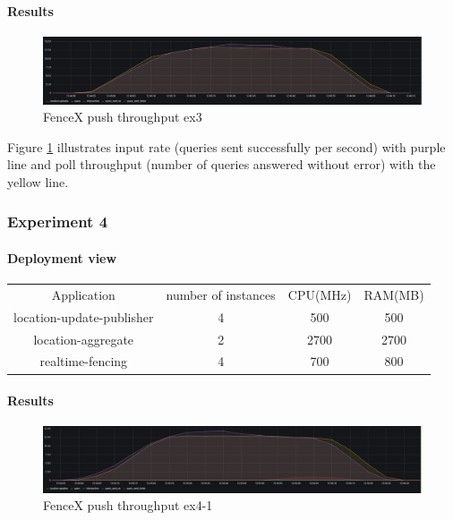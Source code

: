 \documentclass[a4]{report}
\begin{document}
    \paragraph{Results}
    \begin{figure}[ht]
        \caption{FenceX push throughput ex3}
        \label{fig:ex3}
        \includegraphics[scale=0.4]{images/evaluation/ex3-benchmarking(16,9).png}
    \end{figure}

    Figure \ref{fig:ex3} illustrates input rate (queries sent successfully per second) with purple line and poll
    throughput (number of queries answered without error) with the yellow line.

    \subsubsection{Experiment 4}

    \paragraph{Deployment view}
    \begin{center}
        \begin{tabular}{ c c c c }
            Application               & number of instances & CPU(MHz) & RAM(MB) \\
            location-update-publisher & 4                   & 500      & 500     \\
            location-aggregate        & 2                   & 2700     & 2700    \\
            realtime-fencing          & 4                   & 700      & 800     \\
        \end{tabular}
    \end{center}

    \paragraph{Results}
    \begin{figure}[ht]
        \caption{FenceX push throughput ex4-1}
        \label{fig:ex4-1}
        \includegraphics[scale=0.4]{images/evaluation/ex4-benchmarking(19,10).png}
    \end{figure}
\end{document}
